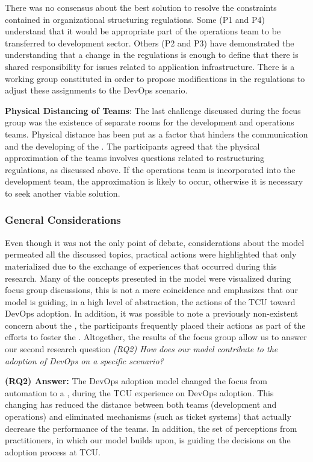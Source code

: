 There was no consensus about the best solution to resolve the constraints
contained in organizational structuring regulations. Some (P1 and P4) understand
that it would be appropriate part of the operations team to be transferred to
development sector. Others (P2 and P3) have demonstrated the understanding that
a change in the regulations is enough to define that there is shared
responsibility for issues related to application infrastructure. There is a
working group constituted in order to propose modifications in the regulations
to adjust these assignments to the DevOps scenario.

\textbf{Physical Distancing of Teams}:
The last challenge discussed during the focus group was the existence of
separate rooms for the development and operations teams. Physical distance has
been put as a factor that hinders the communication and the developing of
the \cc. The participants agreed that the physical approximation of the teams
involves questions related to restructuring regulations, as discussed above. If
the operations team is incorporated into the development team, the approximation
is likely to occur, otherwise it is necessary to seek another viable solution.

\subsubsection{General Considerations}

Even though it was not the only point of debate, considerations about the model
permeated all the discussed topics, practical actions were highlighted that only
materialized due to the exchange of experiences that occurred during this
research. Many of the concepts presented in the model were visualized during
focus group discussions, this is not a mere coincidence and emphasizes that our
model is guiding, in a high level of abstraction, the actions of the TCU toward
DevOps adoption. In addition, it was possible to note a previously non-existent
concern about the \cc, the participants frequently placed their actions as part
of the efforts to foster the \cc. Altogether, the results of the
focus group allow us to answer our second research question 
\emph{(RQ2) How does our model contribute to the adoption of DevOps on a specific scenario?}

\begin{mr}
  {\bf (RQ2) Answer:} The DevOps adoption model
  changed the focus from automation to a \cc,
  during the TCU experience on DevOps adoption.
  This changing has reduced the distance
  between both teams (development and operations) and
  eliminated mechanisms (such as ticket systems)
  that actually decrease the performance of the teams.
  In addition, the set of perceptions from
  practitioners, in which our model builds upon,
  is guiding the decisions on the adoption process
  at TCU. 
\end{mr}


